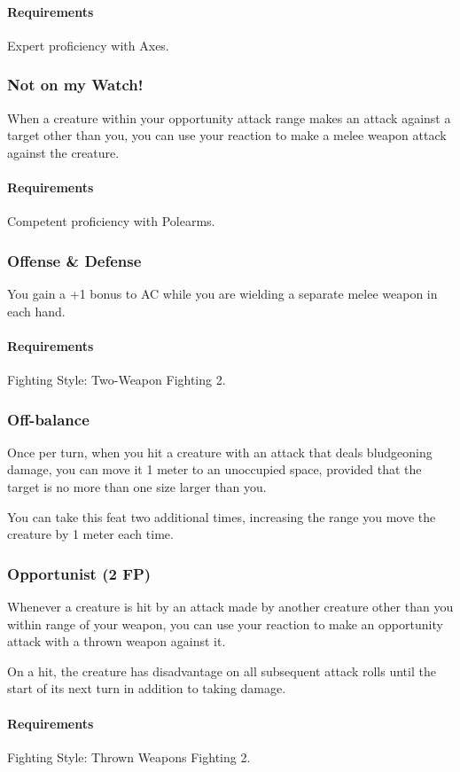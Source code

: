     \paragraph{Requirements} Expert proficiency with Axes.
\subsubsection{Not on my Watch!} \label{feat::notonmywatch}
    When a creature within your opportunity attack range makes an attack against a target other than you, you can use your reaction to make a melee weapon attack against the creature.
    \paragraph{Requirements} Competent proficiency with Polearms.
\subsubsection{Offense \& Defense} \label{feat::offenseanddefense}
    You gain a +1 bonus to AC while you are wielding a separate melee weapon in each hand.
    \paragraph{Requirements} Fighting Style: Two-Weapon Fighting 2.
\subsubsection{Off-balance} \label{feat::offbalance}
    Once per turn, when you hit a creature with an attack that deals bludgeoning damage, you can move it 1 meter to an unoccupied space, provided that the target is no more than one size larger than you.

    You can take this feat two additional times, increasing the range you move the creature by 1 meter each time.
\subsubsection{Opportunist (2 FP)} \label{feat::opportunist}
    Whenever a creature is hit by an attack made by another creature other than you within range of your weapon, you can use your reaction to make an opportunity attack with a thrown weapon against it.

    On a hit, the creature has disadvantage on all subsequent attack rolls until the start of its next turn in addition to taking damage.
    \paragraph{Requirements} Fighting Style: Thrown Weapons Fighting 2.
